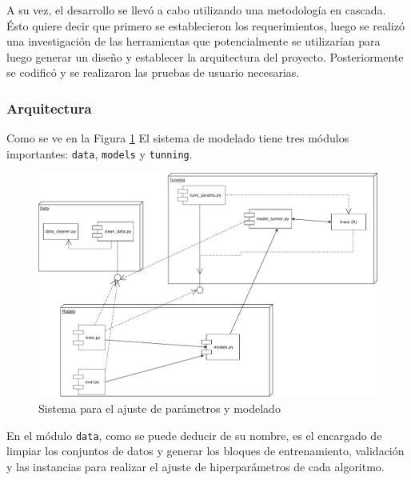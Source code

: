         \par A su vez, el desarrollo se llevó a cabo utilizando una metodología
          en cascada. Ésto quiere decir que primero se establecieron los
          requerimientos, luego se realizó una investigación de las
          herramientas que potencialmente se utilizarían para luego generar
          un diseño y establecer la arquitectura del proyecto. Posteriormente se codificó y se
          realizaron las pruebas de usuario necesarias.

      \subsubsection{Arquitectura}


        \par Como se ve en la Figura \ref{fig:sistema_modelado} El sistema de
          modelado tiene tres módulos importantes: \verb|data|, \verb|models| y
          \verb|tunning|.

          \begin{figure}[hbt]
          \centering%
          \includegraphics[width=1\textwidth]{images/sistema_modeling_mosquitos}%
          \caption{Sistema para el ajuste de parámetros y modelado}\label{fig:sistema_modelado}
          \end{figure}

        \par En el módulo \verb|data|, como se puede deducir de su nombre,
          es el encargado de limpiar los conjuntos de datos y generar los
          bloques de entrenamiento, validación y las instancias para realizar
          el ajuste de hiperparámetros de cada algoritmo.


